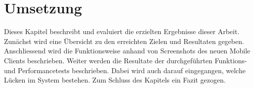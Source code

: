 \section{Umsetzung}

Dieses Kapitel beschreibt und evaluiert die erzielten Ergebnisse dieser Arbeit.
Zunächst wird eine Übersicht zu den erreichten Zielen und Resultaten gegeben.
Anschliessend wird die Funktionsweise anhand von Screenshots des neuen Mobile Clients beschrieben.
Weiter werden die Resultate der durchgeführten Funktions- und Performancetests beschrieben.
Dabei wird auch darauf eingegangen, welche Lücken im System bestehen.
Zum Schluss des Kapitels ein Fazit gezogen.





\clearpage
